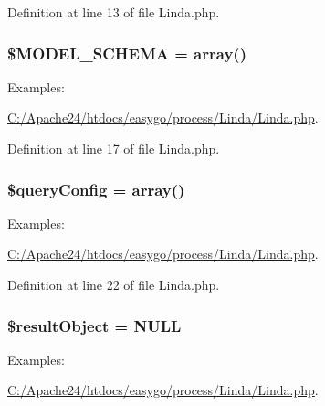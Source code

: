 Definition at line 13 of file Linda.\+php.

\hypertarget{class_linda_a46c628c6bd56ec5880da2515cf352183}{}
\subsubsection[{\$\+M\+O\+D\+E\+L\+\_\+\+S\+C\+H\+E\+M\+A}]{\setlength{\rightskip}{0pt plus 5cm}\$M\+O\+D\+E\+L\+\_\+\+S\+C\+H\+E\+M\+A = array()\hspace{0.3cm}{\ttfamily [protected]}}\label{class_linda_a46c628c6bd56ec5880da2515cf352183}
\begin{Desc}
\item[Examples\+: ]\par
\hyperlink{_c_1_2_apache24_2htdocs_2easygo_2process_2_linda_2_linda_8php-example}{C\+:/\+Apache24/htdocs/easygo/process/\+Linda/\+Linda.\+php}.\end{Desc}


Definition at line 17 of file Linda.\+php.

\hypertarget{class_linda_aea7d038e46660f55592569906cf09494}{}
\subsubsection[{\$query\+Config}]{\setlength{\rightskip}{0pt plus 5cm}\$query\+Config = array()\hspace{0.3cm}{\ttfamily [protected]}}\label{class_linda_aea7d038e46660f55592569906cf09494}
\begin{Desc}
\item[Examples\+: ]\par
\hyperlink{_c_1_2_apache24_2htdocs_2easygo_2process_2_linda_2_linda_8php-example}{C\+:/\+Apache24/htdocs/easygo/process/\+Linda/\+Linda.\+php}.\end{Desc}


Definition at line 22 of file Linda.\+php.

\hypertarget{class_linda_a64270a514fbca17fe7347df6320fc4ba}{}
\subsubsection[{\$result\+Object}]{\setlength{\rightskip}{0pt plus 5cm}\$result\+Object = N\+U\+L\+L\hspace{0.3cm}{\ttfamily [protected]}}\label{class_linda_a64270a514fbca17fe7347df6320fc4ba}
\begin{Desc}
\item[Examples\+: ]\par
\hyperlink{_c_1_2_apache24_2htdocs_2easygo_2process_2_linda_2_linda_8php-example}{C\+:/\+Apache24/htdocs/easygo/process/\+Linda/\+Linda.\+php}.\end{Desc}



